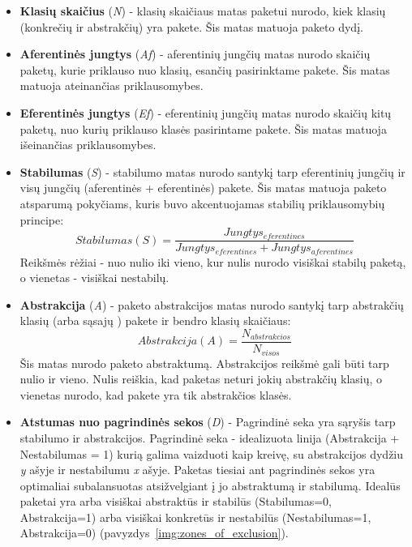 \begin{itemize}
    \item \textbf{Klasių skaičius} (\textit{N}) - klasių skaičiaus matas paketui nurodo, kiek klasių (konkrečių ir abstrakčių) yra pakete.
    Šis matas matuoja paketo dydį.
    \item \textbf{Aferentinės jungtys } (\textit{Af}) - aferentinių jungčių matas nurodo
    skaičių paketų, kurie priklauso nuo klasių, esančių pasirinktame pakete.
    Šis matas matuoja ateinančias priklausomybes.
    \item \textbf{Eferentinės jungtys } (\textit{Ef}) - eferentinių jungčių matas nurodo skaičių kitų paketų,
    nuo kurių priklauso klasės pasirintame pakete.
    Šis matas matuoja išeinančias priklausomybes.
    \item \textbf{Stabilumas} (\textit{S}) - stabilumo matas nurodo santykį tarp eferentinių jungčių ir
    visų jungčių (aferentinės + eferentinės) pakete.
    Šis matas matuoja paketo atsparumą pokyčiams, kuris buvo akcentuojamas stabilių priklausomybių principe:
    \begin{equation}
        Stabilumas (S) =\frac{Jungtys_{eferentines}}{Jungtys_{eferentines} + Jungtys_{aferentines}}
    \end{equation}
    Reikšmės rėžiai - nuo nulio iki vieno, kur nulis nurodo visiškai stabilų paketą, o vienetas - visiškai nestabilų.
    \item \textbf{Abstrakcija} (\textit{A}) - paketo abstrakcijos matas nurodo santykį tarp abstrakčių klasių (arba sąsajų ) pakete ir bendro klasių skaičiaus:
    \begin{equation}
        Abstrakcija (A)=\frac{N_{abstrakcios}}{N_{visos}}
    \end{equation}
    Šis matas nurodo paketo abstraktumą.
    Abstrakcijos reikšmė gali būti tarp nulio ir vieno.
    Nulis reiškia, kad paketas neturi jokių abstrakčių klasių, o vienetas nurodo, kad pakete yra tik abstrakčios klasės.
    \item \textbf{Atstumas nuo pagrindinės sekos} (\textit{D}) -
    Pagrindinė seka yra sąryšis tarp stabilumo ir abstrakcijos.
    Pagrindinė seka - idealizuota linija (Abstrakcija + Nestabilumas = 1) kurią galima vaizduoti kaip kreivę, su abstrakcijos dydžiu \textit{y} ašyje ir nestabilumu \textit{x} ašyje.
    Paketas tiesiai ant pagrindinės sekos yra optimaliai subalansuotas atsižvelgiant į jo abstraktumą ir stabilumą.
    Idealūs paketai yra arba visiškai abstraktūs ir stabilūs (Stabilumas=0, Abstrakcija=1) arba visiškai konkretūs ir nestabilūs (Nestabilumas=1, Abstrakcija=0) (pavyzdys~\ref{img:zones_of_exclusion}).

\end{itemize}
